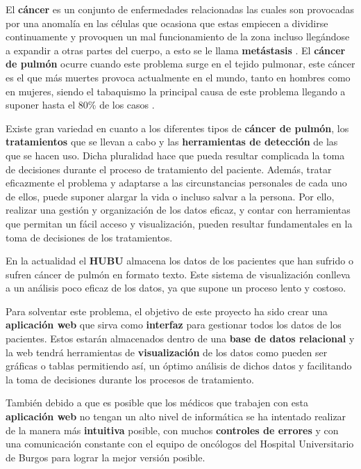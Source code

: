 El \textbf{cáncer} es un conjunto de enfermedades relacionadas las cuales son provocadas por una anomalía en las células que ocasiona que estas empiecen a dividirse continuamente y provoquen un mal funcionamiento de la zona incluso llegándose a expandir a otras partes del cuerpo, a esto se le llama \textbf{metástasis} \cite{cancerweb:online}. El \textbf{cáncer de pulmón} ocurre cuando este problema surge en el tejido pulmonar, este cáncer es el que más muertes provoca actualmente en el mundo, tanto en hombres como en mujeres, siendo el tabaquismo la principal causa de este problema llegando a suponer hasta el 80\% de los casos \cite{cancerpulmon:online}.

Existe gran variedad en cuanto a los diferentes tipos de \textbf{cáncer de pulmón}, los \textbf{tratamientos} que se llevan a cabo y las \textbf{herramientas de detección} de las que se hacen uso. Dicha pluralidad hace que pueda resultar complicada la toma de decisiones durante el proceso de tratamiento del paciente. Además, tratar eficazmente el problema y adaptarse a las circunstancias personales de cada uno de ellos, puede suponer alargar la vida o incluso salvar a la persona. Por ello, realizar una gestión y organización de los datos eficaz, y contar con herramientas que permitan un fácil acceso y visualización, pueden resultar fundamentales en la toma de decisiones de los tratamientos.


En la actualidad el \textbf{HUBU} almacena los datos de los pacientes que han sufrido o sufren cáncer de pulmón en formato texto. Este sistema de visualización conlleva a un análisis poco eficaz de los datos, ya que supone un proceso lento y costoso.

Para solventar este problema, el objetivo de este proyecto ha sido crear una \textbf{aplicación web} que sirva como \textbf{interfaz} para gestionar todos los datos de los pacientes. Estos estarán almacenados dentro de una \textbf{base de datos relacional} y la web tendrá herramientas de \textbf{visualización} de los datos como pueden ser gráficas o tablas permitiendo así, un óptimo análisis de dichos datos y facilitando la toma de decisiones durante los procesos de tratamiento.

También debido a que es posible que los médicos que trabajen con esta  \textbf{aplicación web} no tengan un alto nivel de informática se ha intentado realizar de la manera más \textbf{intuitiva} posible, con muchos  \textbf{controles de errores} y con una comunicación constante con el equipo de oncólogos del Hospital Universitario de Burgos para lograr la mejor versión posible.

